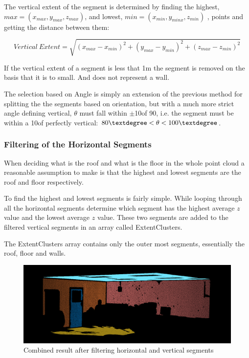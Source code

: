 			The vertical extent of the segment is determined by finding the highest, $max = (x_{max},y_{max},z_{max})$, and lowest, $min = (x_{min},y_{minx},z_{min})$ , points and getting the distance between them:
			
			\begin{equation}
			Vertical \: Extent = \sqrt{(x_{max} - x_{min})^2+(y_{max} - y_{min})^2+(z_{max} - z_{min})^2}
			\end{equation}
			
			If the vertical extent of a segment is less that 1m the segment is removed on the basis that it is to small. And does not represent a wall.
			
			The selection based on Angle is simply an extension of the previous method for splitting the the segments based on orientation, but with a much more strict angle defining vertical, $\theta$ must fall within $\pm$10\textdegree of 90\textdegree, i.e. the segment must be within a 10\textdegree of perfectly vertical: 	$80\textdegree < \theta < 100\textdegree$.
			
			
			\subsubsection{Filtering of the Horizontal Segments}
			
			When deciding what is the roof and what is the floor in the whole point cloud a reasonable assumption to make is that the highest and lowest segments are the roof and floor respectively.
			
			To find the highest and lowest segments is fairly simple. While looping through all the horizontal segments determine which segment has the highest average $z$ value and the lowest average $z$ value. These two segments are added to the filtered vertical segments in an array called ExtentClusters.
			
			The ExtentClusters array contains only the outer most segments, essentially the roof, floor and walls.
			
			\begin{figure}[hbt]
			\centering
			\includegraphics[width=1\linewidth]{"Includes/images/SEG Select/final"}
			\caption{Combined result after filtering horizontal and vertical segments}
			\label{fig:final}
			\end{figure}

